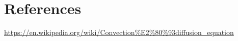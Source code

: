 \documentclass{tufte-handout}\usepackage[]{graphicx}\usepackage[]{xcolor}
\newenvironment{itemize*}%
  {\begin{itemize}%
    \setlength{\itemsep}{0pt}%
    \setlength{\parskip}{0pt}}%
  {\end{itemize}}
\begin{document}

\newpage

\section{References}


\url{https://en.wikipedia.org/wiki/Convection%E2%80%93diffusion_equation}




\end{document}
